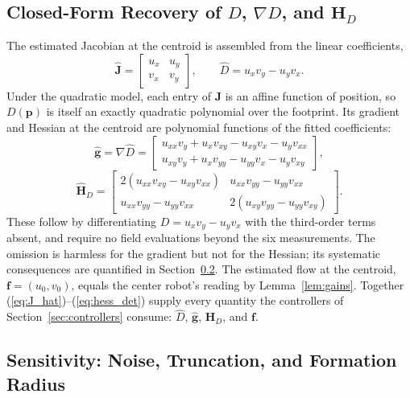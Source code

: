 \documentclass[lettersize,journal]{IEEEtran}
\begin{document}
\subsection{Closed-Form Recovery of $D$, $\nabla D$, and $\mathbf{H}_D$}

The estimated Jacobian at the centroid is assembled from the linear
coefficients,
\begin{equation}
    \hat{\mathbf{J}} =
    \begin{bmatrix} u_x & u_y \\ v_x & v_y \end{bmatrix},
    \qquad
    \hat{D} = u_x v_y - u_y v_x.
    \label{eq:J_hat}
\end{equation}
Under the quadratic model, each entry of $\mathbf{J}$ is an affine
function of position, so $D(\mathbf{p})$ is itself an exactly quadratic
polynomial over the footprint. Its gradient and Hessian at the centroid
are polynomial functions of the fitted coefficients:
\begin{equation}
    \hat{\mathbf{g}} = \nabla \hat{D} =
    \begin{bmatrix}
        u_{xx} v_y + u_x v_{xy} - u_{xy} v_x - u_y v_{xx} \\
        u_{xy} v_y + u_x v_{yy} - u_{yy} v_x - u_y v_{xy}
    \end{bmatrix},
    \label{eq:grad_det}
\end{equation}
\begin{equation}
    \hat{\mathbf{H}}_D =
    \begin{bmatrix}
        2(u_{xx} v_{xy} - u_{xy} v_{xx}) &
        u_{xx} v_{yy} - u_{yy} v_{xx} \\
        u_{xx} v_{yy} - u_{yy} v_{xx} &
        2(u_{xy} v_{yy} - u_{yy} v_{xy})
    \end{bmatrix}.
    \label{eq:hess_det}
\end{equation}
These follow by differentiating $D = u_x v_y - u_y v_x$ with the
third-order terms absent, and require no field evaluations beyond the six
measurements. The omission is harmless for the gradient but not for the
Hessian; its systematic consequences are quantified in
Section~\ref{sec:sensitivity}. The estimated flow at the centroid,
$\mathbf{f} = (u_0, v_0)$, equals the center robot's reading by
Lemma~\ref{lem:gains}. Together
(\ref{eq:J_hat})--(\ref{eq:hess_det}) supply every quantity the
controllers of Section~\ref{sec:controllers} consume: $\hat{D}$,
$\hat{\mathbf{g}}$, $\hat{\mathbf{H}}_D$, and $\mathbf{f}$.

\subsection{Sensitivity: Noise, Truncation, and Formation Radius}
\label{sec:sensitivity}
\end{document}
